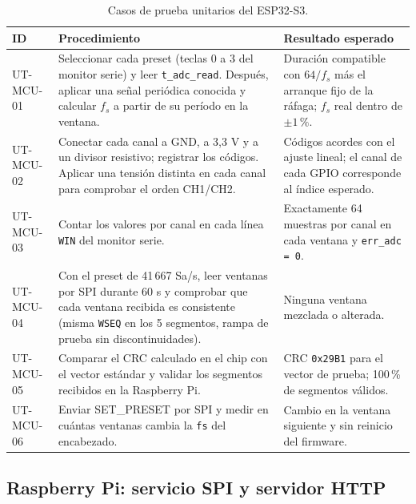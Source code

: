 \documentclass[12pt,a4paper]{article}
\begin{document}
\begin{table}[H]
\centering
\small
\begin{tabular}{@{}p{2.2cm} p{5.3cm} p{6.3cm}@{}}
\toprule
\textbf{ID} & \textbf{Procedimiento} & \textbf{Resultado esperado} \\
\midrule
UT-MCU-01 & Seleccionar cada preset (teclas 0 a 3 del monitor serie) y leer \texttt{t\_adc\_read}. Después, aplicar una señal periódica conocida y calcular $f_s$ a partir de su período en la ventana. & Duración compatible con $64/f_s$ más el arranque fijo de la ráfaga; $f_s$ real dentro de $\pm 1\,\%$. \\
UT-MCU-02 & Conectar cada canal a GND, a 3{,}3 V y a un divisor resistivo; registrar los códigos. Aplicar una tensión distinta en cada canal para comprobar el orden CH1/CH2. & Códigos acordes con el ajuste lineal; el canal de cada GPIO corresponde al índice esperado. \\
UT-MCU-03 & Contar los valores por canal en cada línea \texttt{WIN} del monitor serie. & Exactamente 64 muestras por canal en cada ventana y \texttt{err\_adc = 0}. \\
UT-MCU-04 & Con el preset de 41\,667 Sa/s, leer ventanas por SPI durante 60 s y comprobar que cada ventana recibida es consistente (misma \texttt{WSEQ} en los 5 segmentos, rampa de prueba sin discontinuidades). & Ninguna ventana mezclada o alterada. \\
UT-MCU-05 & Comparar el CRC calculado en el chip con el vector estándar y validar los segmentos recibidos en la Raspberry Pi. & CRC \texttt{0x29B1} para el vector de prueba; 100\,\% de segmentos válidos. \\
UT-MCU-06 & Enviar SET\_PRESET por SPI y medir en cuántas ventanas cambia la \texttt{fs} del encabezado. & Cambio en la ventana siguiente y sin reinicio del firmware. \\
\bottomrule
\end{tabular}
\caption{Casos de prueba unitarios del ESP32-S3.}
\end{table}

\subsection{Raspberry Pi: servicio SPI y servidor HTTP}
\end{document}
